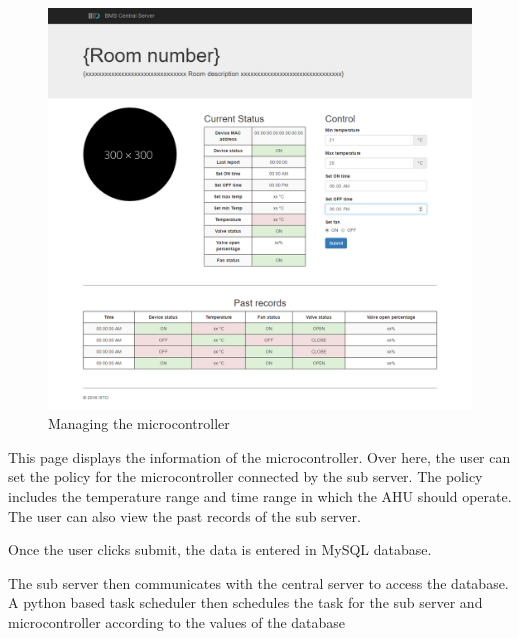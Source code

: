 \documentclass[letterpaper,11pt]{report}
\begin{document}
\newpage
\begin{figure}[h]
\includegraphics[width=\textwidth]{arduino1}
\centering
\captionsetup{justification=centering}
\caption{Managing the microcontroller}
\label{fig:arduino1}
\end{figure}
\newpage This page displays the information of the microcontroller. Over here, the user can set the policy for the microcontroller connected by the sub server. The policy includes the temperature range and time range in which the AHU should operate. The user can also view the past records of the sub server.
\par
Once the user clicks submit, the data is entered in MySQL database.
\par
The sub server then communicates with the central server to access the database. A python based task scheduler then schedules the task for the sub server and microcontroller according to the values of the database


\newpage
\nocite*{}


\end{document}

